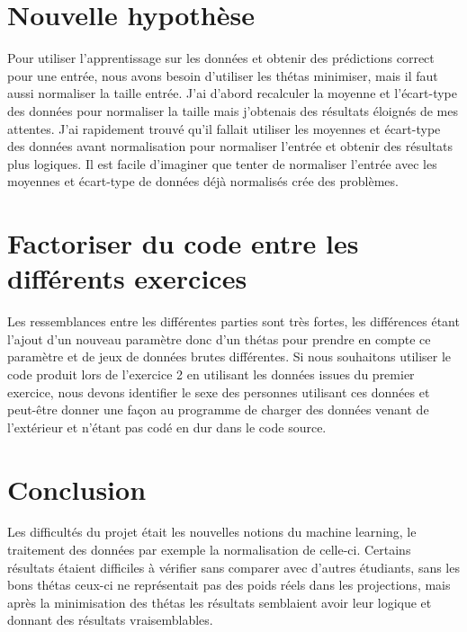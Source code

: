 \documentclass{article}
\begin{document}
\section{Nouvelle hypothèse}
Pour utiliser l'apprentissage sur les données et obtenir des prédictions correct pour une entrée, nous avons besoin d'utiliser les thétas minimiser, mais il faut aussi normaliser la taille entrée. J'ai d'abord recalculer la moyenne et l'écart-type des données pour normaliser la taille mais j'obtenais des résultats éloignés de mes attentes. J'ai rapidement trouvé qu'il fallait utiliser les moyennes et écart-type des données avant normalisation pour normaliser l'entrée et obtenir des résultats plus logiques. Il est facile d'imaginer que tenter de normaliser l'entrée avec les moyennes et écart-type de données déjà normalisés crée des problèmes.


\section{Factoriser du code entre les différents exercices}
Les ressemblances entre les différentes parties sont très fortes, les différences étant l'ajout d'un nouveau paramètre donc d'un thétas pour prendre en compte ce paramètre et de jeux de données brutes différentes. Si nous souhaitons utiliser le code produit lors de l'exercice 2 en utilisant les données issues du premier exercice, nous devons identifier le sexe des personnes utilisant ces données et peut-être donner une façon au programme de charger des données venant de l'extérieur et n'étant pas codé en dur dans le code source.

\section{Conclusion}
Les difficultés du projet était les nouvelles notions du machine learning, le traitement des données par exemple la normalisation de celle-ci. Certains résultats étaient difficiles à vérifier sans comparer avec d'autres étudiants, sans les bons thétas ceux-ci ne représentait pas des poids réels dans les projections, mais après la minimisation des thétas les résultats semblaient avoir leur logique et donnant des résultats vraisemblables.




\end{document}
